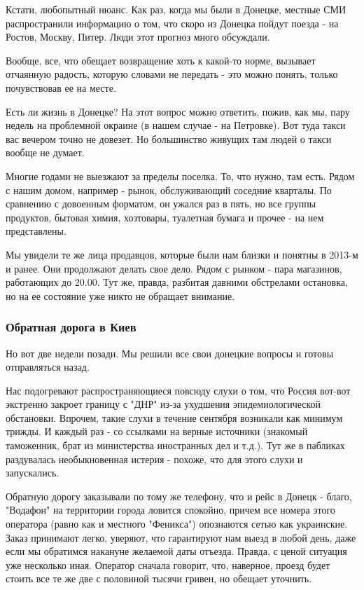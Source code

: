 Кстати, любопытный нюанс. Как раз, когда мы были в Донецке, местные СМИ
распространили информацию о том, что скоро из Донецка пойдут поезда - на
Ростов, Москву, Питер. Люди этот прогноз много обсуждали.

Вообще, все, что обещает возвращение хоть к какой-то норме, вызывает отчаянную
радость, которую словами не передать - это можно понять, только почувствовав ее
на месте.

Есть ли жизнь в Донецке? На этот вопрос можно ответить, пожив, как мы, пару
недель на проблемной окраине (в нашем случае - на Петровке). Вот туда такси вас
вечером точно не довезет. Но большинство живущих там людей о такси вообще не
думает.

Многие годами не выезжают за пределы поселка. То, что нужно, там есть. Рядом с
нашим домом, например - рынок, обслуживающий соседние кварталы. По сравнению с
довоенным форматом, он ужался раз в пять, но все группы продуктов, бытовая
химия, хозтовары, туалетная бумага и прочее - на нем представлены.

Мы увидели те же лица продавцов, которые были нам близки и понятны в 2013-м и
ранее. Они продолжают делать свое дело. Рядом с рынком - пара магазинов,
работающих до 20.00. Тут же, правда, разбитая давними обстрелами остановка, но
на ее состояние уже никто не обращает внимание. 

\subsubsection{Обратная дорога в Киев}

Но вот две недели позади. Мы решили все свои донецкие вопросы и готовы
отправляться назад.

Нас подогревают распространяющиеся повсюду слухи о том, что Россия вот-вот
экстренно закроет границу с "ДНР" из-за ухудшения эпидемиологической
обстановки. Впрочем, такие слухи в течение сентября возникали как минимум
трижды. И каждый раз - со ссылками на верные источники (знакомый таможенник,
брат из министерства иностранных дел и т.д.). Тут же в пабликах раздувалась
необыкновенная истерия - похоже, что для этого слухи и запускались.

Обратную дорогу заказывали по тому же телефону, что и рейс в Донецк - благо,
"Водафон" на территории города ловится спокойно, причем все номера этого
оператора (равно как и местного "Феникса") опознаются сетью как украинские.
Заказ принимают легко, уверяют, что гарантируют нам выезд в любой день, даже
если мы обратимся накануне желаемой даты отъезда. Правда, с ценой ситуация уже
несколько иная. Оператор сначала говорит, что, наверное, проезд будет стоить
все те же две с половиной тысячи гривен, но обещает уточнить.

